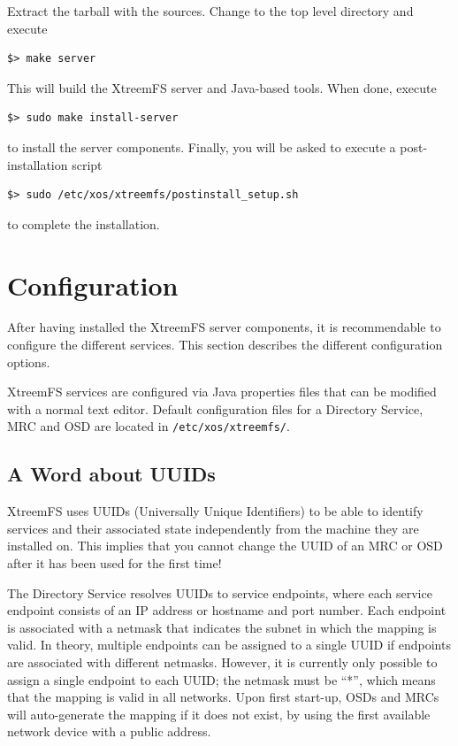 \documentclass[a4paper,10pt]{book}
\begin{document}
Extract the tarball with the sources. Change to the top level directory and execute

\begin{verbatim}
$> make server
\end{verbatim}

This will build the XtreemFS server and Java-based tools. When done, execute

\begin{verbatim}
$> sudo make install-server
\end{verbatim}

to install the server components. Finally, you will be asked to execute a post-installation script

\begin{verbatim}
$> sudo /etc/xos/xtreemfs/postinstall_setup.sh
\end{verbatim}

to complete the installation.

\section{Configuration}
\label{sec:service_config}

After having installed the XtreemFS server components, it is recommendable to configure the different services. This section describes the different configuration options.

XtreemFS services are configured via Java properties files that can be modified with a normal text editor. Default configuration files for a Directory Service, MRC and OSD are located in \texttt{/etc/xos/xtreemfs/}.

\subsection{A Word about UUIDs}

XtreemFS uses UUIDs (Universally Unique Identifiers) to be able to identify services and their associated state independently from the machine they are installed on. This implies that you cannot change the UUID of an MRC or OSD after it has been used for the first time!

The Directory Service resolves UUIDs to service endpoints, where each service endpoint consists of an IP address or hostname and port number. Each endpoint is associated with a netmask that indicates the subnet in which the mapping is valid. In theory, multiple endpoints can be assigned to a single UUID if endpoints are associated with different netmasks. However, it is currently only possible to assign a single endpoint to each UUID; the netmask must be ``*'', which means that the mapping is valid in all networks. Upon first start-up, OSDs and MRCs will auto-generate the mapping if it does not exist, by using the first available network device with a public address.
\end{document}
